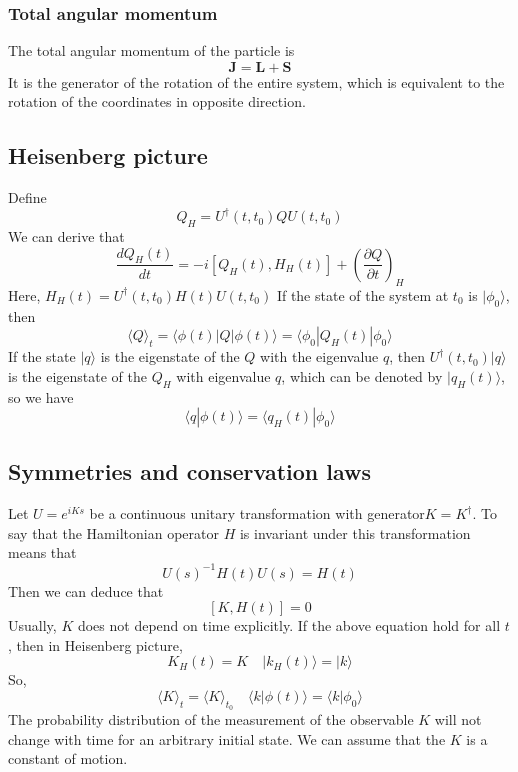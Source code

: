 \documentclass{article}
\begin{document}
\subsubsection{Total angular momentum}
The total angular momentum of the particle is 
\[\mathbf{J} = \mathbf{L} + \mathbf{S}\]
It is the generator of the rotation of the entire system, which is equivalent to the rotation of the coordinates in opposite direction.

\subsection{Heisenberg picture}
Define
\[Q_H = U^{\dagger}(t,t_0)QU(t,t_0)\]
We can derive that
\[\frac{dQ_H(t)}{dt} = -i[Q_H(t),H_H(t)] + \left(\frac{\partial Q}{\partial t}\right)_H \]
Here, $H_H(t) = U^{\dagger}(t,t_0) H(t) U(t,t_0)$
If the state of the system at $t_0$ is $|\phi_0\rangle$, then
\[\langle Q \rangle_t = \langle \phi(t) | Q | \phi(t) \rangle = \langle \phi_0 | Q_H(t) | \phi_0 \rangle\]
If the state $|q\rangle$ is the eigenstate of the $Q$ with the eigenvalue $q$, then $U^{\dagger}(t,t_0)|q\rangle$ is the eigenstate of the $Q_H$ with eigenvalue $q$, which can be denoted by $|q_H(t)\rangle$, so we have
\[\langle q | \phi(t) \rangle = \langle q_H(t) | \phi_0 \rangle\]

\subsection{Symmetries and conservation laws}
Let $U = e^{iKs}$ be a continuous unitary transformation with generator$K=K^{\dagger}$. To say that the Hamiltonian
operator $H$ is invariant under this transformation means that
\[U(s)^{-1} H(t) U(s) = H(t)\]
Then we can deduce that
\[[K,H(t)] = 0\]
Usually, $K$ does not depend on time explicitly. If the above equation hold for all $t$, then in Heisenberg picture, 
\[K_H(t) = K \quad |k_H(t) \rangle = | k \rangle\]
So, 
\[\langle K \rangle_t = \langle K \rangle_{t_0} \quad \langle k | \phi(t) \rangle = \langle k | \phi_0 \rangle\]
The probability distribution of the measurement of the observable $K$ will not change with time for an arbitrary initial state. We can assume that the $K$ is a constant of motion.
\end{document}
